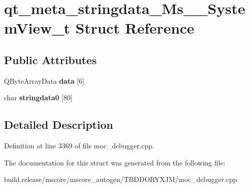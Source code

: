 \hypertarget{structqt__meta__stringdata___ms_____system_view__t}{}\section{qt\+\_\+meta\+\_\+stringdata\+\_\+\+Ms\+\_\+\+\_\+\+System\+View\+\_\+t Struct Reference}
\label{structqt__meta__stringdata___ms_____system_view__t}
\subsection*{Public Attributes}
\begin{DoxyCompactItemize}
\item 
\mbox{\label{structqt__meta__stringdata___ms_____system_view__t_aa52e5caa89a49f7772436b9f86a5661c}} 
Q\+Byte\+Array\+Data {\bfseries data} \mbox{[}6\mbox{]}
\item 
\mbox{\label{structqt__meta__stringdata___ms_____system_view__t_ac85030af5f76dfe3a3bb4219ccd85c68}} 
char {\bfseries stringdata0} \mbox{[}80\mbox{]}
\end{DoxyCompactItemize}


\subsection{Detailed Description}


Definition at line 3369 of file moc\+\_\+debugger.\+cpp.



The documentation for this struct was generated from the following file\+:\begin{DoxyCompactItemize}
\item 
build.\+release/mscore/mscore\+\_\+autogen/\+T\+B\+D\+D\+O\+R\+Y\+X\+J\+M/moc\+\_\+debugger.\+cpp\end{DoxyCompactItemize}
